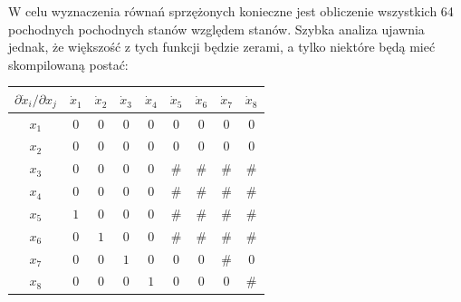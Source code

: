 \documentclass[10pt]{article}
\begin{document}
W celu wyznaczenia równań sprzężonych konieczne jest obliczenie wszystkich 64 pochodnych pochodnych stanów względem stanów. Szybka analiza ujawnia jednak, że większość z tych funkcji będzie zerami, a tylko niektóre będą mieć skompilowaną postać:

\begin{center}
\begin{tabular}{c|c|c|c|c|c|c|c|c}
$\partial \dot{x}_i / \partial x_j$ &
$\dot{x}_1$ & $\dot{x}_2$ & $\dot{x}_3$ & $\dot{x}_4$ &
$\dot{x}_5$ & $\dot{x}_6$ & $\dot{x}_7$ & $\dot{x}_8$ \\ \hline
$x_1$ & $0$ & $0$ & $0$ & $0$ & $0$ & $0$ & $0$ & $0$ \\ \hline
$x_2$ & $0$ & $0$ & $0$ & $0$ & $0$ & $0$ & $0$ & $0$ \\ \hline
$x_3$ & $0$ & $0$ & $0$ & $0$ & \# & \# & \# & \# \\ \hline
$x_4$ & $0$ & $0$ & $0$ & $0$ & \# & \# & \# & \# \\ \hline
$x_5$ & $1$ & $0$ & $0$ & $0$ & \# & \# & \# & \# \\ \hline
$x_6$ & $0$ & $1$ & $0$ & $0$ & \# & \# & \# & \# \\ \hline
$x_7$ & $0$ & $0$ & $1$ & $0$ & $0$ & $0$ & \# & $0$ \\ \hline
$x_8$ & $0$ & $0$ & $0$ & $1$ & $0$ & $0$ & $0$ & \# \\
\end{tabular}
\end{center}
\end{document}
